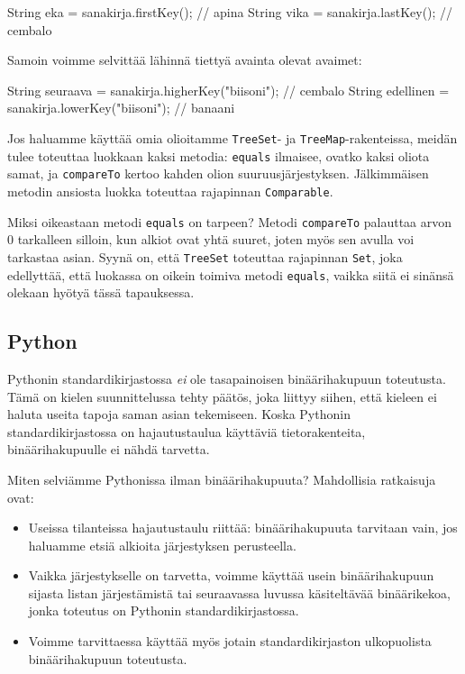 \begin{code}
String eka = sanakirja.firstKey(); // apina
String vika = sanakirja.lastKey(); // cembalo
\end{code}

Samoin voimme selvittää lähinnä tiettyä avainta olevat avaimet:

\begin{code}
String seuraava = sanakirja.higherKey("biisoni"); // cembalo
String edellinen = sanakirja.lowerKey("biisoni"); // banaani
\end{code}

Jos haluamme käyttää omia olioitamme \texttt{TreeSet}- ja
\texttt{TreeMap}-rakenteissa, meidän tulee toteuttaa
luokkaan kaksi metodia:
\texttt{equals} ilmaisee, ovatko kaksi oliota samat,
ja \texttt{compareTo} kertoo kahden olion suuruusjärjestyksen.
Jälkimmäisen metodin ansiosta luokka toteuttaa rajapinnan
\texttt{Comparable}.

Miksi oikeastaan metodi \texttt{equals} on tarpeen?
Metodi \texttt{compareTo} palauttaa arvon 0 tarkalleen silloin,
kun alkiot ovat yhtä suuret, joten myös sen avulla voi
tarkastaa asian.
Syynä on, että \texttt{TreeSet} toteuttaa rajapinnan \texttt{Set},
joka edellyttää, että luokassa on oikein toimiva metodi \texttt{equals},
vaikka siitä ei sinänsä olekaan hyötyä tässä tapauksessa.

\subsection{Python}

Pythonin standardikirjastossa \emph{ei} ole 
tasapainoisen binäärihakupuun toteutusta.
Tämä on kielen suunnittelussa tehty päätös,
joka liittyy siihen, että kieleen ei haluta
useita tapoja saman asian tekemiseen.
Koska Pythonin standardikirjastossa on hajautustaulua
käyttäviä tietorakenteita, binäärihaku\-puulle ei nähdä tarvetta.

Miten selviämme Pythonissa ilman binäärihakupuuta?
Mahdollisia ratkaisuja ovat:

\begin{itemize}
\item Useissa tilanteissa hajautustaulu riittää:
binäärihakupuuta tarvitaan vain, jos haluamme etsiä
alkioita järjestyksen perusteella.
\item Vaikka järjestykselle on tarvetta, voimme käyttää
usein binäärihaku\-puun sijasta listan järjestämistä tai
seuraavassa luvussa käsiteltävää binäärikekoa, jonka toteutus
on Pythonin standardikirjastossa.
\item Voimme tarvittaessa käyttää myös jotain standardikirjaston
ulkopuolista binäärihakupuun toteutusta.
\end{itemize}

